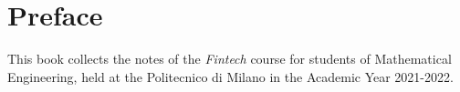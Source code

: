 \section*{Preface}

This book collects the notes of the \emph{Fintech} course for students of Mathematical Engineering, held at the Politecnico di Milano in the Academic Year 2021-2022.

